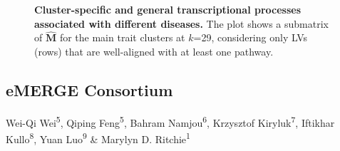 \documentclass[
  a4paper,
]{article}
\begin{document}
\begin{figure}
\hypertarget{fig:clustering:heatmap}{%
\centering
% 
\caption{\textbf{Cluster-specific and general transcriptional processes associated with different diseases.}
The plot shows a submatrix of \(\hat{\mathbf{M}}\) for the main trait clusters at \(k\)=29, considering only LVs (rows) that are well-aligned with at least one pathway.}\label{fig:clustering:heatmap}
}
\end{figure}

\clearpage

\hypertarget{emergeconsortium}{%
\subsection{eMERGE Consortium}\label{emergeconsortium}}

Wei-Qi Wei\textsuperscript{5},
Qiping Feng\textsuperscript{5},
Bahram Namjou\textsuperscript{6},
Krzysztof Kiryluk\textsuperscript{7},
Iftikhar Kullo\textsuperscript{8},
Yuan Luo\textsuperscript{9} \&
Marylyn D. Ritchie\textsuperscript{1}

\clearpage
\end{document}
